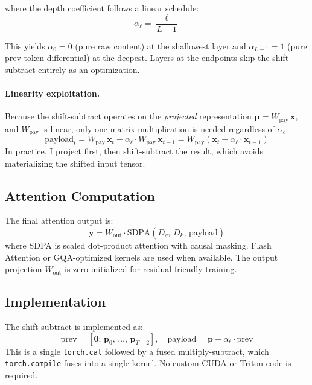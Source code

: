 \documentclass[11pt]{article}
\begin{document}
where the depth coefficient follows a linear schedule:
\begin{equation}
    \alpha_\ell = \frac{\ell}{L - 1}
    \label{eq:schedule}
\end{equation}

This yields $\alpha_0 = 0$ (pure raw content) at the shallowest layer and $\alpha_{L-1} = 1$ (pure prev-token differential) at the deepest. Layers at the endpoints skip the shift-subtract entirely as an optimization.

\paragraph{Linearity exploitation.}
Because the shift-subtract operates on the \emph{projected} representation $\mathbf{p} = W_{\text{pay}}\, \mathbf{x}$, and $W_{\text{pay}}$ is linear, only one matrix multiplication is needed regardless of $\alpha_\ell$:
\begin{equation}
    \text{payload}_t = W_{\text{pay}}\, \mathbf{x}_t - \alpha_\ell \cdot W_{\text{pay}}\, \mathbf{x}_{t-1}
    = W_{\text{pay}}\!\left(\mathbf{x}_t - \alpha_\ell \cdot \mathbf{x}_{t-1}\right)
\end{equation}
In practice, I project first, then shift-subtract the result, which avoids materializing the shifted input tensor.

\subsection{Attention Computation}
The final attention output is:
\begin{equation}
    \mathbf{y} = W_{\text{out}} \cdot \text{SDPA}(D_q,\, D_k,\, \text{payload})
    \label{eq:attn}
\end{equation}
where SDPA is scaled dot-product attention with causal masking. Flash Attention or GQA-optimized kernels are used when available. The output projection $W_{\text{out}}$ is zero-initialized for residual-friendly training.

\subsection{Implementation}
The shift-subtract is implemented as:
\begin{equation}
    \text{prev} = [\mathbf{0};\, \mathbf{p}_0,\, \ldots,\, \mathbf{p}_{T-2}], \quad
    \text{payload} = \mathbf{p} - \alpha_\ell \cdot \text{prev}
\end{equation}
This is a single \texttt{torch.cat} followed by a fused multiply-subtract, which \texttt{torch.compile} fuses into a single kernel. No custom CUDA or Triton code is required.
\end{document}
